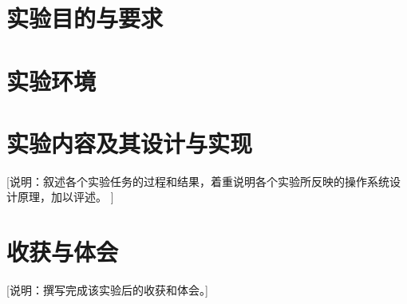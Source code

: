 \chapter{实验目的与要求}

\chapter{实验环境}

\chapter{实验内容及其设计与实现}

[说明：叙述各个实验任务的过程和结果，着重说明各个实验所反映的操作系统设计原理，加以评述。 ]


\chapter{收获与体会}

[说明：撰写完成该实验后的收获和体会。]